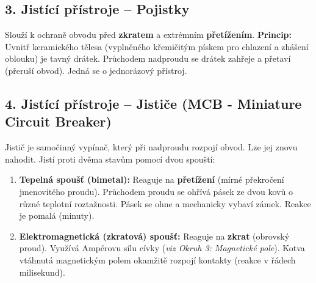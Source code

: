 \documentclass[a4paper,10pt]{article}
\begin{document}
\begin{vysvetlenibox}
\subsection*{3. Jistící přístroje – Pojistky}

Slouží k ochraně obvodu před \textbf{zkratem} a extrémním \textbf{přetížením}.
\textbf{Princip:} Uvnitř keramického tělesa (vyplněného křemičitým pískem pro chlazení a zhášení oblouku) je tavný drátek. Průchodem nadproudu se drátek zahřeje a přetaví (přeruší obvod). Jedná se o jednorázový přístroj.

\subsection*{4. Jistící přístroje – Jističe (MCB - Miniature Circuit Breaker)}

Jistič je samočinný vypínač, který při nadproudu rozpojí obvod. Lze jej znovu nahodit. Jistí proti dvěma stavům pomocí dvou spouští:

\begin{enumerate}
  \item \textbf{Tepelná spoušť (bimetal):} Reaguje na \textbf{přetížení} (mírné překročení jmenovitého proudu). Průchodem proudu se ohřívá pásek ze dvou kovů o různé teplotní roztažnosti. Pásek se ohne a mechanicky vybaví zámek. Reakce je pomalá (minuty).
  \item \textbf{Elektromagnetická (zkratová) spoušť:} Reaguje na \textbf{zkrat} (obrovský proud). Využívá Ampérovu sílu cívky (\textit{viz Okruh 3: Magnetické pole}). Kotva vtáhnutá magnetickým polem okamžitě rozpojí kontakty (reakce v řádech milisekund).
\end{enumerate}

\begin{center}
\end{center}
\end{vysvetlenibox}
\end{document}
